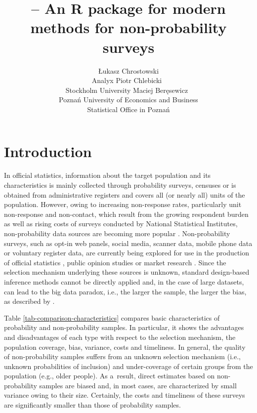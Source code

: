 \documentclass[
]{jss}
\author{
Łukasz Chrostowski\\Analyx \And Piotr
Chlebicki~\orcidlink{0009-0006-4867-7434}\\Stockholm University
\AND Maciej Beręsewicz~\orcidlink{0000-0002-8281-4301}\\Poznań
University of Economics and Business\\
Statistical Office in Poznań
}
\title{\pkg{nonprobsvy} -- An R package for modern methods for
non-probability surveys}
\begin{document}
\section{Introduction}\label{sec-introduction}

In official statistics, information about the target population and its
characteristics is mainly collected through probability surveys,
censuses or is obtained from administrative registers and covers all (or
nearly all) units of the population. However, owing to increasing
non-response rates, particularly unit non-response and non-contact,
which result from the growing respondent burden as well as rising costs
of surveys conducted by National Statistical Institutes, non-probability
data sources are becoming more popular
\citep{berkesewicz2017two, beaumont2020probability, biffignandi2021handbook}.
Non-probability surveys, such as opt-in web panels, social media,
scanner data, mobile phone data or voluntary register data, are
currently being explored for use in the production of official
statistics \citep{citro2014multiple, daas2015big}, public opinion
studies \citep{Schonlau2017} or market research \citep[cf.][]{Grow2022}.
Since the selection mechanism underlying these sources is unknown,
standard design-based inference methods cannot be directly applied and,
in the case of large datasets, can lead to the big data paradox, i.e.,
the larger the sample, the larger the bias, as described by
\citet{meng2018statistical}.

Table \ref{tab-comparison-characteristics} compares basic
characteristics of probability and non-probability samples. In
particular, it shows the advantages and disadvantages of each type with
respect to the selection mechanism, the population coverage, bias,
variance, costs and timeliness. In general, the quality of
non-probability samples suffers from an unknown selection mechanism
(i.e., unknown probabilities of inclusion) and under-coverage of certain
groups from the population (e.g., older people). As a~result, direct
estimates based on non-probability samples are biased and, in most
cases, are characterized by small variance owing to their size.
Certainly, the costs and timeliness of these surveys are significantly
smaller than those of probability samples.
\end{document}
